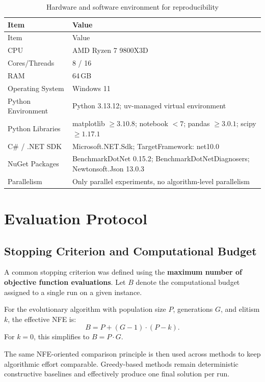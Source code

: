 \documentclass[12pt,a4paper]{report}
\begin{document}
\begin{longtable}{ll}
\caption{Hardware and software environment for reproducibility}\label{tab:hardware_software}\\
\toprule
Item & Value \\
\midrule
\endfirsthead
\toprule
Item & Value \\
\midrule
\endhead
CPU & AMD Ryzen 7 9800X3D \\
Cores/Threads & 8 / 16 \\
RAM & 64\,GB \\
Operating System & Windows 11 \\
Python Environment & Python 3.13.12; uv-managed virtual environment\\
Python Libraries & matplotlib $\ge 3.10.8$; notebook $< 7$; pandas $\ge 3.0.1$; scipy $\ge 1.17.1$ \\
C\# / .NET SDK & Microsoft.NET.Sdk; TargetFramework: net10.0\\
NuGet Packages & BenchmarkDotNet 0.15.2; BenchmarkDotNetDiagnosers; Newtonsoft.Json 13.0.3 \\
Parallelism & Only parallel experiments, no algorithm-level parallelism \\
\bottomrule
\end{longtable}



\section{Evaluation Protocol}
\subsection{Stopping Criterion and Computational Budget}

A common stopping criterion was defined using the \textbf{maximum number of objective function evaluations}. Let \(B\) denote the computational budget assigned to a single run on a given instance.

For the evolutionary algorithm with population size \(P\), generations \(G\), and elitism \(k\), the effective NFE is:
\[
B = P + (G - 1)\cdot(P-k).
\]
For \(k=0\), this simplifies to \(B = P\cdot G\).

The same NFE-oriented comparison principle is then used across methods to keep algorithmic effort comparable. Greedy-based methods remain deterministic constructive baselines and effectively produce one final solution per run.
\end{document}
